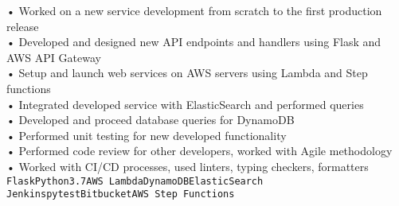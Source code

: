 {\begin{entrylist}
{			• Worked on a new service development from scratch to the first production release \\
            • Developed and designed new API endpoints and handlers using Flask and AWS API Gateway \\
            • Setup and launch web services on AWS servers using Lambda and Step functions \\
            • Integrated developed service with ElasticSearch and performed queries \\
            • Developed and proceed database queries for DynamoDB \\
            • Performed unit testing for new developed functionality \\
            • Performed code review for other developers, worked with Agile methodology \\
            • Worked with CI/CD processes, used linters, typing checkers, formatters \\
			\texttt{Flask}\slashsep\texttt{Python3.7}\slashsep\texttt{AWS Lambda}\slashsep\texttt{DynamoDB}\slashsep\texttt{ElasticSearch}\\
			\texttt{Jenkins}\slashsep\texttt{pytest}\slashsep\texttt{Bitbucket}\slashsep\texttt{AWS Step Functions}
		}
	\end{entrylist}
}

\newcommand{\cvtemplateeducation}{Education}
\newcommand{\cveducation}{
	\begin{entrylist}
	    \entry
		{2018}
		{Python course, EPAM Systems}
		{Saint Petersburg}
		{
			Generally I studied Python on EPAM courses. During course, all main Python topics have been learnt
			and put into practice. My final project was written on Python, Flask.
			It was a web service for getting some statistics from external API and displaying it in graphs view.\\
			\texttt{Python3}\slashsep\texttt{Flask}
		}
		\entry
		{2014 – 2020}
		{Bachelor/Master's Degrees in Software Engineering, ITMO University}
		{Saint Petersburg}
		{
			I studied Software Engineering in University. My final project was written on Python, Django.
			It was a web service for saving educational results [certificates] based on Blockchain technology.\\
			\texttt{Python3}\slashsep\texttt{Django}\slashsep\texttt{SQLite}
		}
	\end{entrylist}
}

\newcommand{\cvtemplatecontacts}{Contacts}
\newcommand{\cvcontacts}{
	\icontext{MapMarker}{12}{Montenegro}\\
	\icontext{At}{12}{\href{mailto:valeriiashestakova@gmail.com}{valeriiashestakova@gmail.com}}\\
	\icontext{Github}{12}{\href{https://github.com/lerushe}{@lerushe}}\\
}
\newcommand{\cvtemplatelanguages}{Languages}
\newcommand{\cvlanguages}{
	\bubbles{
    	5/Russian,
    	4/English
	}{}
}
